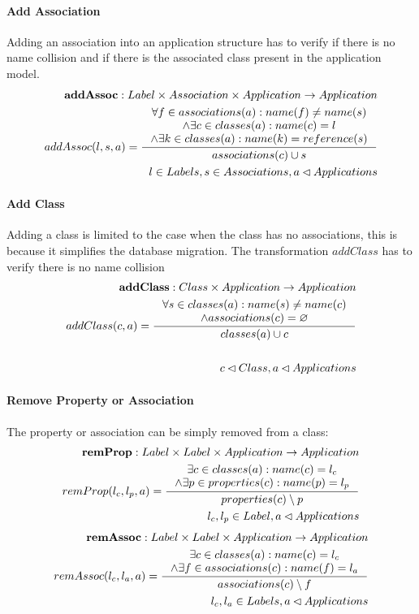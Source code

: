 \documentclass[11pt]{article}
\begin{document}
\paragraph{Add Association} Adding an association into an application structure has to verify if there is no name collision and if there is the associated class present in the application model.
\begin{align*}
	\mathbf{addAssoc} : Label \times Association \times Application \rightarrow Application \\
	addAssoc(l, s, a) = \inference{\forall f \in associations(a) : name(f) \neq name(s) \\ \wedge \exists c \in classes(a) : name(c) = l \\ \wedge \exists k \in classes(a) : name(k) = reference(s) }{associations(c) \cup s}\\
	l \in Labels, s \in Associations, a \lhd Applications
\end{align*}

\paragraph{Add Class} Adding a class is limited to the case when the class has no associations, this is because it simplifies the database migration. The transformation $addClass$ has to verify there is no name collision
\begin{align*}
	\mathbf{addClass} : Class \times Application \rightarrow Application \\ 
	addClass(c, a) = \inference{\forall s \in classes(a) : name(s) \neq name(c) \\ \wedge associations(c) = \varnothing }{classes(a) \cup c} \\ \\
	c \lhd Class, a \lhd Applications
\end{align*}

\paragraph{Remove Property or Association} The property or association can be simply removed from a class:
\begin{align*}
 	\mathbf{remProp} : Label \times Label \times Application \rightarrow Application \\
 	remProp(l_c, l_p, a) = \inference{\exists c \in classes(a) : name(c) = l_c \\ \wedge \exists p \in properties(c) : name(p) = l_p
	}{properties(c) \setminus p }\\
	l_c, l_p \in Label, a \lhd Applications 
\end{align*}
\begin{align*}
	\mathbf{remAssoc} : Label \times Label \times Application \rightarrow Application \\
	remAssoc(l_c, l_a, a) = \inference{\exists c \in classes(a) : name(c) = l_c \\ \wedge \exists f \in associations(c) : name(f) = l_a }{associations(c) \setminus f} \\
	l_c, l_a \in Labels, a \lhd Applications
\end{align*}
\end{document}
